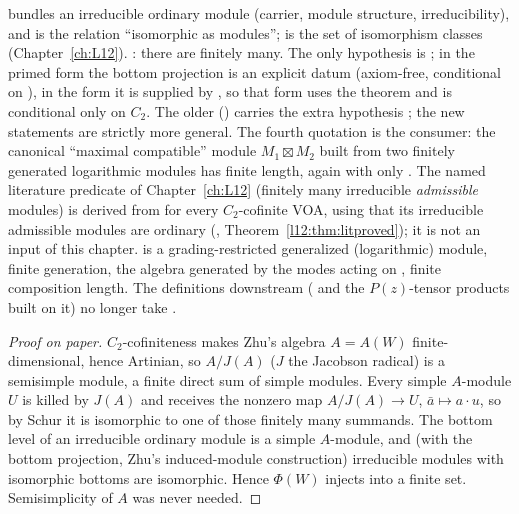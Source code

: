 \begin{dictionary}
 bundles an irreducible ordinary module (carrier, module structure, irreducibility), and
 is the relation ``isomorphic as modules'';  is the set of isomorphism classes
(Chapter~\ref{ch:L12}). : there are finitely many. The only hypothesis is ; in the
primed form the bottom projection  is an explicit datum (axiom-free, conditional on ), in the
 form it is supplied by , so that form uses the theorem  and is conditional
only on $C_2$. The older
 () carries the extra hypothesis ;
the new statements are strictly more general. The fourth quotation is the consumer: the canonical ``maximal
compatible'' module $M_1\boxtimes M_2$ built from two finitely generated logarithmic modules has finite length, again
with only . The named literature predicate  of Chapter~\ref{ch:L12} (finitely
many irreducible \emph{admissible} modules) is derived from  for every $C_2$-cofinite VOA, using
that its irreducible admissible modules are ordinary (,
Theorem~\ref{l12:thm:litproved}); it is not an input of this chapter.  is a grading-restricted generalized (logarithmic) module,  finite
generation,  the algebra generated by the modes acting on ,  finite
composition length. The definitions downstream ( and the $P(z)$-tensor products built on it) no
longer take .
\end{dictionary}

\begin{proof}[Proof on paper]
$C_2$-cofiniteness makes Zhu's algebra $A=A(W)$ finite-dimensional, hence Artinian, so $A/J(A)$ ($J$ the Jacobson
radical) is a semisimple module, a finite direct sum of simple modules. Every simple $A$-module $U$ is killed by $J(A)$
and receives the nonzero map $A/J(A)\to U$, $\bar a\mapsto a\cdot u$, so by Schur it is isomorphic to one of those finitely
many summands. The bottom level of an irreducible ordinary module is a simple $A$-module, and (with the bottom projection,
Zhu's induced-module construction) irreducible modules with isomorphic bottoms are isomorphic. Hence $\Phi(W)$ injects
into a finite set. Semisimplicity of $A$ was never needed.
\end{proof}

